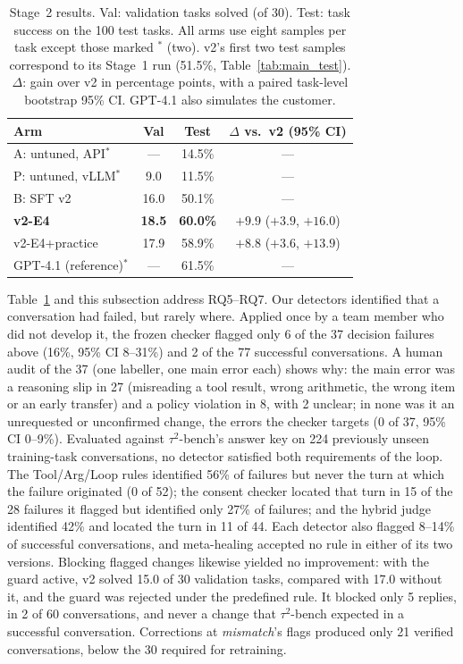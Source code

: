 \documentclass[11pt]{article}
\begin{document}
\begin{table}[t]
\centering
\footnotesize
\setlength{\tabcolsep}{2pt}
\begin{tabular}{@{}lccc@{}}
\toprule
\textbf{Arm} & \textbf{Val} & \textbf{Test} & \textbf{$\Delta$ vs.\ v2 (95\% CI)} \\
\midrule
A: untuned, API$^\ast$ & --- & 14.5\% & --- \\
P: untuned, vLLM$^\ast$ & 9.0 & 11.5\% & --- \\
B: SFT v2 & 16.0 & 50.1\% & --- \\
\textbf{v2-E4} & \textbf{18.5} & \textbf{60.0\%} & $\mathbf{+9.9}$ ($+3.9$, $+16.0$) \\
v2-E4+practice & 17.9 & 58.9\% & $+8.8$ ($+3.6$, $+13.9$) \\
\midrule
GPT-4.1 (reference)$^\ast$ & --- & 61.5\% & --- \\
\bottomrule
\end{tabular}
\caption{Stage~2 results. Val: validation tasks solved (of 30). Test: task success on the 100 test tasks. All arms use eight samples per task except those marked $^\ast$ (two). v2's first two test samples correspond to its Stage~1 run (51.5\%, Table~\ref{tab:main_test}). $\Delta$: gain over v2 in percentage points, with a paired task-level bootstrap 95\% CI. GPT-4.1 also simulates the customer.}
\label{tab:stage2}
\end{table}

Table~\ref{tab:stage2} and this subsection address RQ5--RQ7. Our detectors identified that a conversation had failed, but rarely where. Applied once by a team member who did not develop it, the frozen checker flagged only 6 of the 37 decision failures above (16\%, 95\% CI 8--31\%) and 2 of the 77 successful conversations. A human audit of the 37 (one labeller, one main error each) shows why: the main error was a reasoning slip in 27 (misreading a tool result, wrong arithmetic, the wrong item or an early transfer) and a policy violation in 8, with 2 unclear; in none was it an unrequested or unconfirmed change, the errors the checker targets (0 of 37, 95\% CI 0--9\%). Evaluated against $\tau^2$-bench's answer key on 224 previously unseen training-task conversations, no detector satisfied both requirements of the loop. The Tool/Arg/Loop rules identified 56\% of failures but never the turn at which the failure originated (0 of 52); the consent checker located that turn in 15 of the 28 failures it flagged but identified only 27\% of failures; and the hybrid judge identified 42\% and located the turn in 11 of 44. Each detector also flagged 8--14\% of successful conversations, and meta-healing accepted no rule in either of its two versions. Blocking flagged changes likewise yielded no improvement: with the guard active, v2 solved 15.0 of 30 validation tasks, compared with 17.0 without it, and the guard was rejected under the predefined rule. It blocked only 5 replies, in 2 of 60 conversations, and never a change that $\tau^2$-bench expected in a successful conversation. Corrections at \emph{mismatch}'s flags produced only 21 verified conversations, below the 30 required for retraining.
\end{document}
